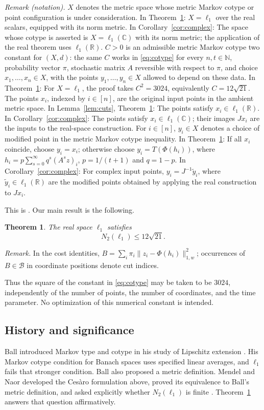 \documentclass[11pt]{article}
\newtheorem{theorem}{Theorem}[section]
\theoremstyle{definition}
\theoremstyle{remark}
\numberwithin{equation}{section}
\newcommand{\R}{\mathbb R}
\newcommand{\N}{\mathbb N}
\begin{document}
\noindent\textit{Remark (notation).} $X$ denotes the metric space whose metric Markov cotype or point configuration is under consideration. In Theorem~\ref{thm:main}: $X=\ell_1$ over the real scalars, equipped with its norm metric. In Corollary~\ref{cor:complex}: The space whose cotype is asserted is $X=\ell_1(\mathbb C)$ with its norm metric; the application of the real theorem uses $\ell_1(\R)$. $C>0$ is an admissible metric Markov cotype two constant for $(X,d)$: the same $C$ works in \eqref{eq:cotype} for every $n,t\in\N$, probability vector $\pi$, stochastic matrix $A$ reversible with respect to $\pi$, and choice $x_1,\ldots,x_n\in X$, with the points $y_1,\ldots,y_n\in X$ allowed to depend on these data. In Theorem~\ref{thm:main}: For $X=\ell_1$, the proof takes $C^2=3024$, equivalently $C=12\sqrt{21}$. The points $x_i$, indexed by $i\in[n]$, are the original input points in the ambient metric space. In Lemma~\ref{lem:cuts}, Theorem~\ref{thm:main}: The points satisfy $x_i\in\ell_1(\R)$. In Corollary~\ref{cor:complex}: The points satisfy $x_i\in\ell_1(\mathbb C)$; their images $Jx_i$ are the inputs to the real-space construction. For $i\in[n]$, $y_i\in X$ denotes a choice of modified point in the metric Markov cotype inequality. In Theorem~\ref{thm:main}: If all $x_i$ coincide, choose $y_i=x_i$; otherwise choose $y_i=T(\Phi(h_i))$, where $h_i=p\sum_{s=0}^\infty q^s(A^s z)_i$, $p=1/(t+1)$ and $q=1-p$. In Corollary~\ref{cor:complex}: For complex input points, $y_i=J^{-1}\widetilde y_i$, where $\widetilde y_i\in\ell_1(\R)$ are the modified points obtained by applying the real construction to $Jx_i$.


This is \cite[Definition~1.2]{MendelNaor13}. Our main result is
the following.

\begin{theorem}\label{thm:main}
The real space $\ell_1$ satisfies
\[
 N_2(\ell_1)\leq12\sqrt{21}.
\]
\end{theorem}

\noindent\textit{Remark.} In the cost identities, $B=\sum_i\pi_i\|z_i-\Phi(h_i)\|_{1,w}^2$; occurrences of $B\in\mathcal B$ in coordinate positions denote cut indices.


Thus the square of the constant in \eqref{eq:cotype} may be taken
to be $3024$, independently of the number of points, the number of
coordinates, and the time parameter. No optimization of this
numerical constant is intended.

\subsection*{History and significance}
Ball introduced Markov type and cotype in his study of Lipschitz
extension \cite{Ball92}. His Markov cotype condition for Banach
spaces uses specified linear averages, and $\ell_1$ fails that
stronger condition. Ball also proposed a metric definition.
Mendel and Naor developed the Ces\`aro formulation above, proved
its equivalence to Ball's metric definition, and asked explicitly
whether $N_2(\ell_1)$ is finite
\cite[Question~1.15 and Section~7]{MendelNaor13}.
Theorem~\ref{thm:main} answers that question affirmatively.
\end{document}
